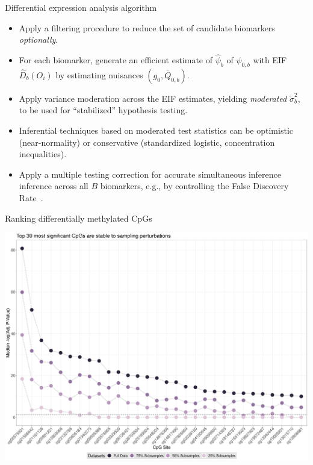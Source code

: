 \documentclass{beamer}
\begin{document}

\begin{frame}[c]{Differential expression analysis algorithm}

\begin{center}
\begin{itemize}
  \itemsep6pt
  \item Apply a filtering procedure to reduce the set of candidate
    biomarkers~\citep{tuglus2009modified} \textit{optionally}.
   \item For each biomarker, generate an efficient estimate of $\hat{\psi}_b$ of
    $\psi_{0,b}$ with EIF $\hat{D}_b(O_i)$ by estimating nuisances $(g_0,
    \overline{Q}_{0,b})$.
  \item Apply variance moderation across the EIF estimates, yielding
    \textit{moderated} $\tilde{\sigma}_b^2$, to be used for ``stabilized''
    hypothesis testing.
  \item Inferential techniques based on moderated test statistics can be
    optimistic (near-normality) or conservative (standardized logistic,
    concentration inequalities).
  \item Apply a multiple testing correction for accurate simultaneous inference
    inference across all $B$ biomarkers, e.g., by controlling the False
    Discovery Rate~\citep{benjamini1995controlling}.
\end{itemize}
\end{center}

\note{
}
\end{frame}


\begin{frame}{Ranking differentially methylated CpGs}

\centering
\includegraphics[origin=c,scale=0.22]{cpg_ranks}

\note{
}
\end{frame}
\end{document}
